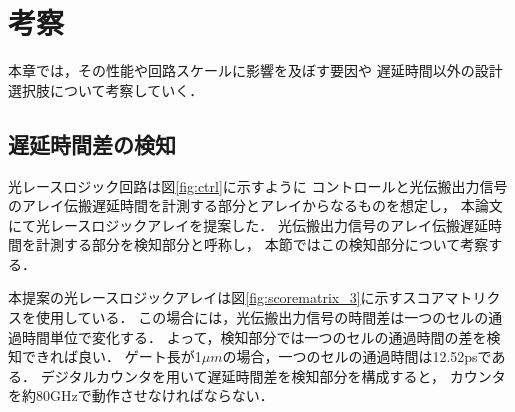 \chapter{考察}
本章では，その性能や回路スケールに影響を及ぼす要因や
遅延時間以外の設計選択肢について考察していく．
\section{遅延時間差の検知}
光レースロジック回路は図\ref{fig:ctrl}に示すように
コントロールと光伝搬出力信号のアレイ伝搬遅延時間を計測する部分とアレイからなるものを想定し，
本論文にて光レースロジックアレイを提案した．
光伝搬出力信号のアレイ伝搬遅延時間を計測する部分を検知部分と呼称し，
本節ではこの検知部分について考察する．

本提案の光レースロジックアレイは図\ref{fig:scorematrix_3}に示すスコアマトリクスを使用している．
この場合には，光伝搬出力信号の時間差は一つのセルの通過時間単位で変化する．
よって，検知部分では一つのセルの通過時間の差を検知できれば良い．
ゲート長が1$\mu m$の場合，一つのセルの通過時間は12.52psである．
デジタルカウンタを用いて遅延時間差を検知部分を構成すると，
カウンタを約80GHzで動作させなければならない．

